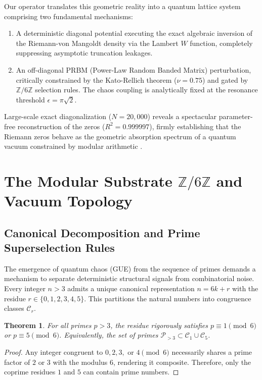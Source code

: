 \documentclass[prl,aps,floatfix,superscriptaddress,10pt]{revtex4-2}
\newtheorem{theorem}{Theorem}[section]
\newcommand{\Zmod}{\mathbb{Z}/6\mathbb{Z}}
\begin{document}
Our operator translates this geometric reality into a quantum lattice system comprising two fundamental mechanisms:
\begin{enumerate}
    \item A deterministic diagonal potential executing the exact algebraic inversion of the Riemann-von Mangoldt density via the Lambert $W$ function, completely suppressing asymptotic truncation leakages.
    \item An off-diagonal PRBM (Power-Law Random Banded Matrix) perturbation, critically constrained by the Kato-Rellich theorem ($\nu = 0.75$) and gated by $\Zmod$ selection rules. The chaos coupling is analytically fixed at the resonance threshold $\epsilon = \pi\sqrt{2}$.
\end{enumerate}
Large-scale exact diagonalization ($N=20,000$) reveals a spectacular parameter-free reconstruction of the zeros ($R^2 = 0.999997$), firmly establishing that the Riemann zeros behave as the geometric absorption spectrum of a quantum vacuum constrained by modular arithmetic \cite{Connes1999}.


\section{The Modular Substrate \texorpdfstring{$\mathbb{Z}/6\mathbb{Z}$}{Z/6Z} and Vacuum Topology}

\subsection{Canonical Decomposition and Prime Superselection Rules}

The emergence of quantum chaos (GUE) from the sequence of primes demands a mechanism to separate deterministic structural signals from combinatorial noise. Every integer $n > 3$ admits a unique canonical representation $n = 6k + r$ with the residue $r \in \{0,1,2,3,4,5\}$. This partitions the natural numbers into congruence classes $\mathcal{C}_r$. 

\begin{theorem}
For all primes $p > 3$, the residue rigorously satisfies $p \equiv 1 \pmod 6$ or $p \equiv 5 \pmod 6$. Equivalently, the set of primes $\mathcal{P}_{>3} \subset \mathcal{C}_1 \cup \mathcal{C}_5$.
\end{theorem}

\begin{proof}
Any integer congruent to $0, 2, 3,$ or $4 \pmod 6$ necessarily shares a prime factor of $2$ or $3$ with the modulus $6$, rendering it composite. Therefore, only the coprime residues $1$ and $5$ can contain prime numbers.
\end{proof}
\end{document}
